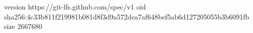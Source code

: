 version https://git-lfs.github.com/spec/v1
oid sha256:4c33b811f219981b081d8f3d9a572dea7af648bef5ab6d127205055b3b6091fb
size 2667680
